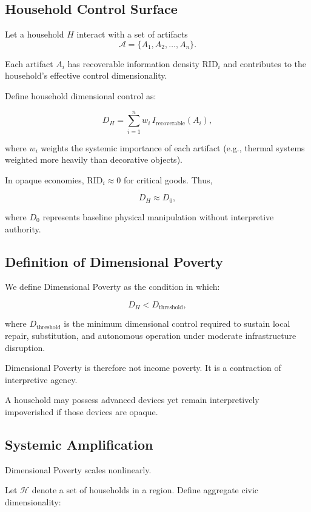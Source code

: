 \documentclass[11pt]{article}
\begin{document}
\subsection{Household Control Surface}

Let a household $H$ interact with a set of artifacts
\[
\mathcal{A} = \{A_1, A_2, \dots, A_n\}.
\]

Each artifact $A_i$ has recoverable information density $\text{RID}_i$
and contributes to the household's effective control dimensionality.

Define household dimensional control as:

\[
D_H = \sum_{i=1}^{n} w_i \, I_{\text{recoverable}}(A_i),
\]

where $w_i$ weights the systemic importance of each artifact
(e.g., thermal systems weighted more heavily than decorative objects).

In opaque economies, $\text{RID}_i \approx 0$ for critical goods.
Thus,

\[
D_H \approx D_0,
\]

where $D_0$ represents baseline physical manipulation without
interpretive authority.

\subsection{Definition of Dimensional Poverty}

We define Dimensional Poverty as the condition in which:

\[
D_H < D_{\text{threshold}},
\]

where $D_{\text{threshold}}$ is the minimum dimensional control required
to sustain local repair, substitution, and autonomous operation under
moderate infrastructure disruption.

Dimensional Poverty is therefore not income poverty.
It is a contraction of interpretive agency.

A household may possess advanced devices yet remain
interpretively impoverished if those devices are opaque.

\subsection{Systemic Amplification}

Dimensional Poverty scales nonlinearly.

Let $\mathcal{H}$ denote a set of households in a region.
Define aggregate civic dimensionality:
\end{document}
